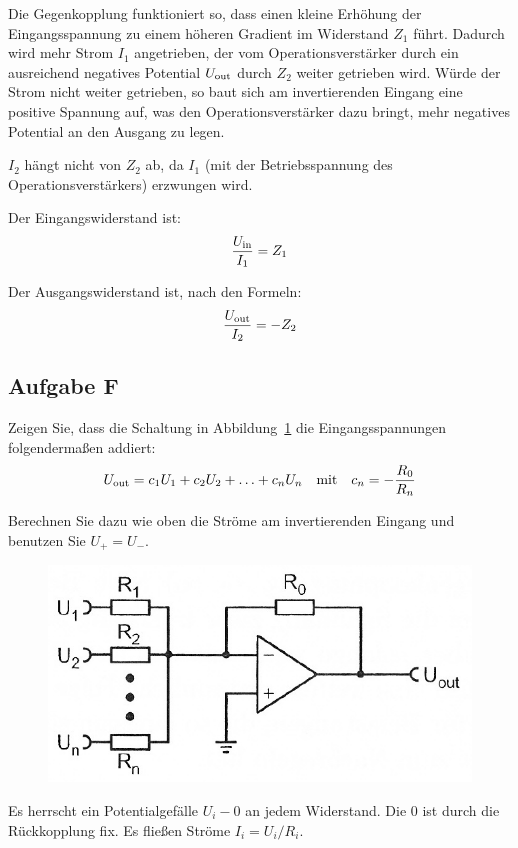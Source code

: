Die Gegenkopplung funktioniert so, dass einen kleine Erhöhung der
Eingangsspannung zu einem höheren Gradient im Widerstand $Z_1$ führt. Dadurch
wird mehr Strom $I_1$ angetrieben, der vom Operationsverstärker durch ein
ausreichend negatives Potential $U_\text{out}$ durch $Z_2$ weiter getrieben wird.
Würde der Strom nicht weiter getrieben, so baut sich am invertierenden Eingang
eine positive Spannung auf, was den Operationsverstärker dazu bringt, mehr
negatives Potential an den Ausgang zu legen.

$I_2$ hängt nicht von $Z_2$ ab, da $I_1$ (mit der Betriebsspannung des
Operationsverstärkers) erzwungen wird. 

Der Eingangswiderstand ist:
\[
	\frac{U_\text{in}}{I_1} = Z_1
\]

Der Ausgangswiderstand ist, nach den Formeln:
\[
	\frac{U_\text{out}}{I_2} = - Z_2
\]

\subsection{Aufgabe F}

\begin{problem}
	Zeigen Sie, dass die Schaltung in Abbildung~\ref{fig:5_6-6} die
	Eingangsspannungen folgendermaßen addiert:
	\[
		U_\text{out} = c_1 U_1 + c_2 U_2 + \ldots + c_n U_n
		\quad \text{mit} \quad
		c_n = - \frac{R_0}{R_n}
	\]

	Berechnen Sie dazu wie oben die Ströme am invertierenden Eingang und
	benutzen Sie $U_+ = U_-$.
\end{problem}

\begin{figure}[htbp]
	\centering
	\includegraphics[width=.7\linewidth]{Anleitung/5_6-6.png}
	\caption{%
		\cite[Abbildung~5/6.6]{physik313-Anleitung}
	}
	\label{fig:5_6-6}
\end{figure}

Es herrscht ein Potentialgefälle $U_i - 0$ an jedem Widerstand. Die 0 ist
durch die Rückkopplung fix. Es fließen Ströme $I_i = U_i / R_i$.


